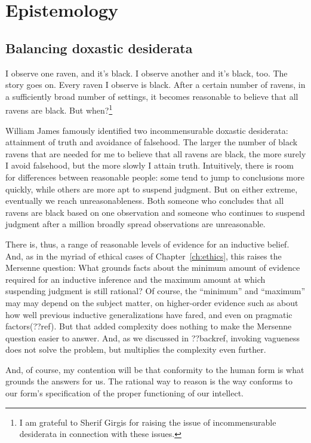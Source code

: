 \def\mychapter{V}

\chapter{Epistemology}\label{ch:epistemology}
\section{Balancing doxastic desiderata}
I observe one raven, and it's black. I observe another and it's black, too. The story goes on. Every
raven I observe is black. After a certain number of ravens, in a sufficiently broad number of settings,
it becomes reasonable to believe that all ravens are black. But when?\footnote{I am grateful to Sherif Girgis for raising the issue of incommensurable desiderata in connection with these issues.}

William James famously identified two incommensurable doxastic desiderata: attainment of truth and avoidance of falsehood.
The larger the number of black ravens that are needed for me to believe that all ravens are black, the more surely
I avoid falsehood, but the more slowly I attain truth. Intuitively, there is room for differences between reasonable
people: some tend to jump to conclusions more quickly, while others are more apt to suspend judgment. But on either
extreme, eventually we reach unreasonableness. Both someone who concludes that all ravens are black based on one 
observation and someone who continues to suspend judgment after a million broadly spread observations are unreasonable.

There is, thus, a range of reasonable levels of evidence for an inductive belief. And, as in the myriad of ethical
cases of Chapter~\ref{ch:ethics}, this raises the Mersenne question: What grounds facts about the minimum amount of 
evidence required for an inductive inference and the maximum amount at which suspending judgment is still rational? 
Of course, the ``minimum'' and ``maximum'' may may depend on the subject matter, on higher-order evidence such as about 
how well previous inductive generalizations have fared, and even on pragmatic factors(??ref). But that added complexity does
nothing to make the Mersenne question easier to answer. And, as we discussed in ??backref, invoking vagueness does not
solve the problem, but multiplies the complexity even further.

And, of course, my contention will be that conformity to the human form is what grounds the answers for us. The
rational way to reason is the way conforms to our form's specification of the proper functioning of our intellect.

